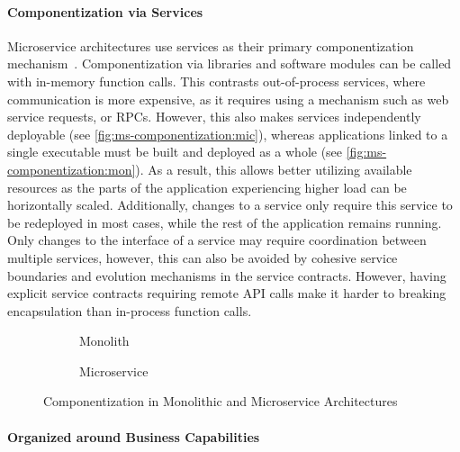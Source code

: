 \paragraph{Componentization via Services}

Microservice architectures use services as their primary componentization mechanism~\cite{Lewis2014, Dragoni2017}.
Componentization via libraries and software modules can be called with in-memory function calls.
This contrasts out-of-process services, where communication is more expensive, as it requires using a mechanism such as web service requests, or \acp{RPC}.
However, this also makes services independently deployable (see \autoref{fig:ms-componentization:mic}), whereas applications linked to a single executable must be built and deployed as a whole (see \autoref{fig:ms-componentization:mon}).
As a result, this allows better utilizing available resources as the parts of the application experiencing higher load can be horizontally scaled.
Additionally, changes to a service only require this service to be redeployed in most cases, while the rest of the application remains running.
Only changes to the interface of a service may require coordination between multiple services, however, this can also be avoided by cohesive service boundaries and evolution mechanisms in the service contracts.
However, having explicit service contracts requiring remote \ac{API} calls make it harder to breaking encapsulation than in-process function calls.

\begin{figure}[!htb]
    \centering
    \begin{subfigure}{.5\textwidth}
        \centering
        
        \caption{Monolith}\label{fig:ms-componentization:mon}
    \end{subfigure}%
    \begin{subfigure}{.5\textwidth}
        \centering
        
        \caption{Microservice}\label{fig:ms-componentization:mic}
    \end{subfigure}
    \caption{Componentization in Monolithic and Microservice Architectures~\cite{Lewis2014}}\label{fig:ms-componentization}
\end{figure}

\paragraph{Organized around Business Capabilities}

